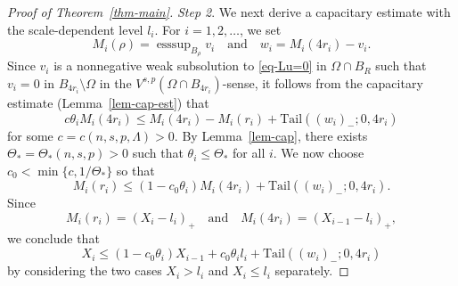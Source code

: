 \documentclass[11pt]{amsart}
\theoremstyle{plain}
\theoremstyle{definition}
\numberwithin{equation}{section}
\DeclareMathOperator*{\esssup}{esssup}
\begin{document}
\begin{proof}[Proof of Theorem~\ref{thm-main}]
\emph{Step 2}. We next derive a capacitary estimate with the scale-dependent level $l_i$. For $i=1, 2,\dots$, we set
    \begin{equation*}
        M_i(\rho)=\esssup_{B_{\rho}}v_i \quad \text{and} \quad w_i=M_i(4r_i)-v_i.
    \end{equation*}
    Since $v_i$ is a nonnegative weak subsolution to \eqref{eq-Lu=0} in $\Omega \cap B_R$ such that $v_i = 0$ in $B_{4r_i} \setminus \Omega$ in the $V^{s, p}(\Omega \cap B_{4r_i})$-sense, it follows from the capacitary estimate (Lemma~\ref{lem-cap-est}) that
    \begin{equation*}
        c \theta_iM_i(4r_i) \leq M_i(4r_i)-M_i(r_i)+\mathrm{Tail}((w_i)_-; 0, 4r_i)
    \end{equation*}
    for some $c=c(n, s, p, \Lambda)>0$. By Lemma~\ref{lem-cap}, there exists $\Theta_{\ast}=\Theta_{\ast}(n, s, p)>0$ such that $\theta_i \leq \Theta_\ast$ for all $i$. We now choose $c_0 < \min\{ c, 1/\Theta_\ast\}$ so that
    \begin{equation*}
        M_i(r_i) \leq (1-c_0\theta_i)M_i(4r_i)+\mathrm{Tail}((w_i)_-; 0, 4r_i).
    \end{equation*}
    Since
    \begin{equation*}
        M_i(r_i)=(X_i-l_i)_+ \quad \text{and} \quad M_i(4r_i)=(X_{i-1}-l_i)_+,
    \end{equation*}
    we conclude that
    \begin{equation}\label{eq-capacity-recurrence}
        X_i \leq (1-c_0\theta_i)X_{i-1}+c_0\theta_il_i+\mathrm{Tail}((w_i)_-; 0, 4r_i)
    \end{equation}
    by considering the two cases $X_i>l_i$ and $X_i\leq l_i$ separately.


\end{proof}
\end{document}
